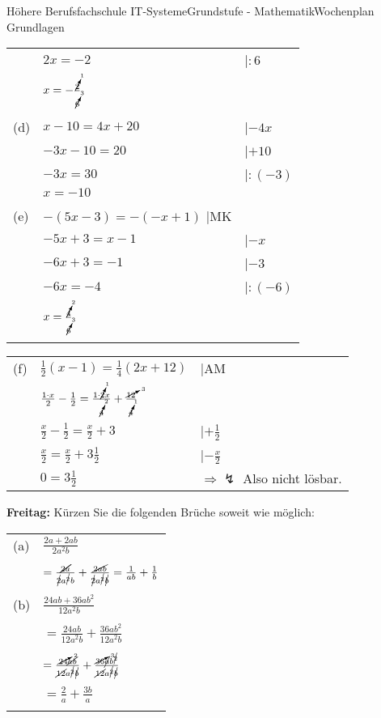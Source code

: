 \documentclass[oneside,openany,headings=optiontotoc,11pt,numbers=noenddot]{scrreprt}
\begin{document}
\begin{worksheet}{Höhere Berufsfachschule IT-Systeme}{Grundstufe - Mathematik}{Wochenplan Grundlagen}
\begin{framed}
\begin{tabularx}{\textwidth}{lll}
				& \(2x = -2\) & |\(:6\)\\
				& \(x = -\frac{\cancelto{1}{2}}{\cancelto{3}{6}}\)\\\\
				(d) & \(x-10 = 4x+20\) & |\(-4x\)\\
				& \(-3x -10 = 20\) & |\(+10\)\\
				& \(-3x = 30\) & |\(:(-3)\)\\
				& \(x = -10\)\\\\
				(e) & \(-(5x-3) =-(-x+1)\) |MK\\
				& \(-5x+3 = x-1\) & |\(-x\)\\
				& \(-6x + 3 = -1\) & |\(-3\)\\
				& \(-6x = -4\) & |\(:(-6)\)\\
				& \(x = \frac{\cancelto{2}{4}}{\cancelto{3}{6}}\)\\\\
			\end{tabularx}
			\begin{tabularx}{\textwidth}{lll}
				(f) & \(\frac{1}{2}(x-1) = \frac{1}{4}(2x+12)\) & |AM\\
				& \(\frac{1\cdot{}x}{2} - \frac{1}{2} = \frac{1\cdot{}\cancelto{1}{2}x}{\cancelto{2}{4}} + \frac{\cancelto{3}{12}}{\cancelto{1}{4}}\)\\
				& \(\frac{x}{2} - \frac{1}{2} = \frac{x}{2} + 3\) & |\(+\frac{1}{2}\)\\
				& \(\frac{x}{2} = \frac{x}{2} + 3\frac{1}{2}\) & |\(-\frac{x}{2}\)\\
				& \(0 = 3\frac{1}{2}\) & \(\Rightarrow \lightning\) Also nicht lösbar.
			\end{tabularx}
		\end{framed}
		\begin{framed}
			\noindent
			\textbf{Freitag:} Kürzen Sie die folgenden Brüche soweit wie möglich:\\
			\begin{tabularx}{\textwidth}{lX}
				(a) & \(\frac{2a+2ab}{2a^2b}\)\\\\
				& \(= \frac{\cancel{2a}}{\cancel{2}a^{\cancel{2}}b} + \frac{\cancel{2ab}}{\cancel{2}a^{\cancel{2}}\cancel{b}} = \frac{1}{ab} + \frac{1}{b}\)\\\\
				(b) & \(\frac{24ab + 36ab^2}{12a^2b}\)\\\\
				& \(= \frac{24ab}{12a^2b} + \frac{36ab^2}{12a^2b}\)\\\\
				& \(= \frac{\cancelto{2}{24}\cancel{ab}}{\cancel{12}a^{\cancel{2}}\cancel{b}} + \frac{\cancelto{3}{36}\cancel{a}b^{\cancel{2}}}{\cancel{12}a^{\cancel{2}}\cancel{b}}\)\\\\
				& \(= \frac{2}{a} + \frac{3b}{a}\)\\\\
				

\end{tabularx}
\end{framed}
\end{worksheet}
\end{document}
